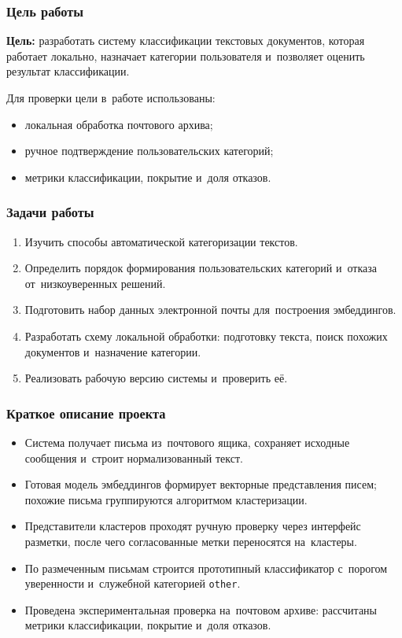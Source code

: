 \begin{frame}
    \frametitle{Цель работы}
    \textbf{Цель:} разработать систему классификации текстовых документов,
    которая работает локально, назначает категории пользователя
    и~позволяет оценить результат классификации.

    \medskip
    Для проверки цели в~работе использованы:
    \begin{itemize}
        \item локальная обработка почтового архива;
        \item ручное подтверждение пользовательских категорий;
        \item метрики классификации, покрытие и~доля отказов.
    \end{itemize}
\end{frame}

\begin{frame}[t]
    \frametitle{Задачи работы}
    \small
    \setlength{\itemsep}{0.25em}
    \begin{enumerate}
        \item Изучить способы автоматической категоризации текстов.
        \item Определить порядок формирования пользовательских категорий
              и~отказа от~низкоуверенных решений.
        \item Подготовить набор данных электронной почты для~построения эмбеддингов.
        \item Разработать схему локальной обработки: подготовку текста, поиск
              похожих документов и~назначение категории.
        \item Реализовать рабочую версию системы и~проверить её.
    \end{enumerate}
\end{frame}

\begin{frame}
    \frametitle{Краткое описание проекта}
    \begin{itemize}
        \item Система получает письма из~почтового ящика, сохраняет исходные
              сообщения и~строит нормализованный текст.
        \item Готовая модель эмбеддингов формирует векторные представления
              писем; похожие письма группируются алгоритмом кластеризации.
        \item Представители кластеров проходят ручную проверку через интерфейс
              разметки, после чего согласованные метки переносятся на~кластеры.
        \item По размеченным письмам строится прототипный классификатор
              с~порогом уверенности и~служебной категорией \texttt{other}.
        \item Проведена экспериментальная проверка на~почтовом архиве:
              рассчитаны метрики классификации, покрытие и~доля отказов.
    \end{itemize}
\end{frame}
